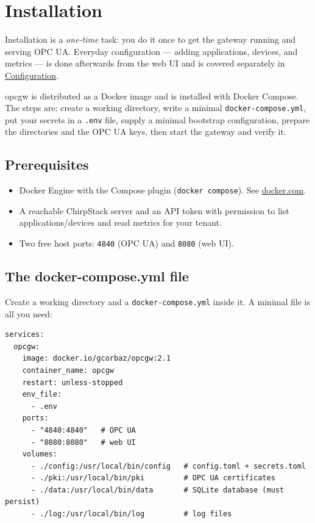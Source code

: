 \chapter{Installation}\label{ch-installation}

Installation is a \emph{one-time} task: you do it once to get the gateway running and serving OPC UA. Everyday configuration --- adding applications, devices, and metrics --- is done afterwards from the web UI and is covered separately in \hyperref[ch-configuration]{Configuration}.

opcgw is distributed as a Docker image and is installed with Docker Compose. The steps are: create a working directory, write a minimal \texttt{docker-compose.yml}, put your secrets in a \texttt{.env} file, supply a minimal bootstrap configuration, prepare the directories and the OPC UA keys, then start the gateway and verify it.

\section{Prerequisites}\label{sec-install-prerequisites}

\begin{itemize}
\item
  Docker Engine with the Compose plugin (\texttt{docker\ compose}). See \href{https://docs.docker.com/get-docker/}{docker.com}.
\item
  A reachable ChirpStack server and an API token with permission to list applications/devices and read metrics for your tenant.
\item
  Two free host ports: \texttt{4840} (OPC UA) and \texttt{8080} (web UI).
\end{itemize}

\section{The docker-compose.yml file}\label{sec-install-compose}

Create a working directory and a \texttt{docker-compose.yml} inside it. A minimal file is all you need:

\begin{lstlisting}
services:
  opcgw:
    image: docker.io/gcorbaz/opcgw:2.1
    container_name: opcgw
    restart: unless-stopped
    env_file:
      - .env
    ports:
      - "4840:4840"   # OPC UA
      - "8080:8080"   # web UI
    volumes:
      - ./config:/usr/local/bin/config   # config.toml + secrets.toml
      - ./pki:/usr/local/bin/pki         # OPC UA certificates
      - ./data:/usr/local/bin/data       # SQLite database (must persist)
      - ./log:/usr/local/bin/log         # log files
\end{lstlisting}

